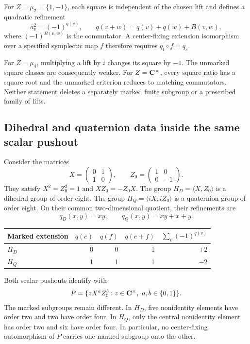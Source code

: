 For $Z=\mu_2=\{1,-1\}$, each square is independent of the chosen lift and defines a quadratic refinement
\[
 a_v^2=(-1)^{q(v)},\qquad
 q(v+w)=q(v)+q(w)+B(v,w),
 \tag{26.2}\label{eq:quadratic}
\]
where $(-1)^{B(v,w)}$ is the commutator. A center-fixing extension isomorphism over a specified symplectic map $f$ therefore requires $q_t\circ f=q_s$.

For $Z=\mu_4$, multiplying a lift by $i$ changes its square by $-1$. The unmarked square classes are consequently weaker. For $Z=\mathbf C^\times$, every square ratio has a square root and the unmarked criterion reduces to matching commutators. Neither statement deletes a separately marked finite subgroup or a prescribed family of lifts.

\subsection{Dihedral and quaternion data inside the same scalar pushout}
Consider the matrices
\[
 X=\begin{pmatrix}0&1\\1&0\end{pmatrix},\qquad
 Z_0=\begin{pmatrix}1&0\\0&-1\end{pmatrix}.
\]
They satisfy $X^2=Z_0^2=1$ and $XZ_0=-Z_0X$. The group $H_D=\langle X,Z_0\rangle$ is a dihedral group of order eight. The group $H_Q=\langle iX,iZ_0\rangle$ is a quaternion group of order eight. On their common two-dimensional quotient, their refinements are
\[
 q_D(x,y)=xy,\qquad q_Q(x,y)=xy+x+y.
 \tag{26.3}\label{eq:DQ}
\]

\begin{center}\begin{tabular}{lrrrr}\toprule
Marked extension & $q(e)$ & $q(f)$ & $q(e+f)$ & $\sum_v(-1)^{q(v)}$\\\midrule
$H_D$ & 0 & 0 & 1 & $+2$\\
$H_Q$ & 1 & 1 & 1 & $-2$\\\bottomrule
\end{tabular}\end{center}

Both scalar pushouts identify with
\[
 P=\{zX^aZ_0^b:z\in\C^\times,\ a,b\in\{0,1\}\}.
\]
The marked subgroups remain different. In $H_D$, five nonidentity elements have order two and two have order four. In $H_Q$, only the central nonidentity element has order two and six have order four. In particular, no center-fixing automorphism of $P$ carries one marked subgroup onto the other.

